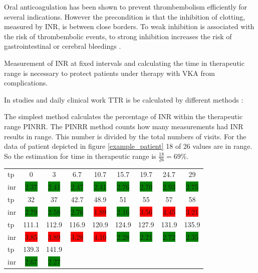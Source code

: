 Oral anticoagulation has been shown to prevent thrombembolism efficiently for several indications.  However the precondition is that the inhibition of clotting, measured by \ac{INR}, is between close borders. To weak inhibition is associated with the risk of thrombembolic events, to strong inhibition increases the risk of gastrointestinal or cerebral bleedings \cite{Van_der_Meer_1993}.

Measurement of INR at fixed intervals and calculating the time in therapeutic range is necessary to protect patients under therapy with \ac{VKA} from complications.

In studies and daily clinical work \ac{TTR} is be calculated by different methods \cite{Kaatz_2008}:


The simplest method calculates the percentage of \ac{INR} within the therapeutic range \ac{PINRR}. The \ac{PINRR} method counts how many measurements had INR results in range. This number is divided by the total numbers of visits. For the data of patient depicted in figure \ref{example_patient} 18 of 26 values are in range. So the estimation for time in therapeutic range is $\frac{18}{26}= 69 \%$. 

\begin{tabular}{l*{8}{c}}
	tp& 
	0 & 3 & 6.7 & 10.7 & 15.7 & 19.7 & 24.7 & 29 \\
	inr&
	\colorbox{green}{2.37}&
	\colorbox{green}{2.41}&
	\colorbox{green}{2.47}&
	\colorbox{green}{2.41}&
	\colorbox{green}{2.76}&
	\colorbox{green}{2.70}&
	\colorbox{green}{2.93}&
	\colorbox{green}{2.75}\\
	tp&
	32 & 37 & 42.7 & 48.9 & 51 & 55 & 57 & 58 \\
	inr&
	\colorbox{green}{2.79}&
	\colorbox{green}{2.58}&
	\colorbox{green}{2.76}&
	\colorbox{red}{1.89}&
	\colorbox{green}{2.16}&
	\colorbox{red}{3.56}&
	\colorbox{red}{4.45}&
	\colorbox{red}{3.21} \\
	tp&
	111.1&112.9&116.9&120.9&124.9&127.9&131.9&135.9 \\
	inr&
	\colorbox{red}{3.85}&
	\colorbox{red}{3.89}&
	\colorbox{red}{3.28}&
	\colorbox{red}{4.10}&
	\colorbox{green}{2.28}&
	\colorbox{green}{2.21}&
	\colorbox{green}{2.72}&
	\colorbox{green}{2.35} \\
	tp&
	139.3 & 141.9\\
	inr&
	\colorbox{green}{2.67}&
	\colorbox{green}{2.27}
	
\end{tabular}


